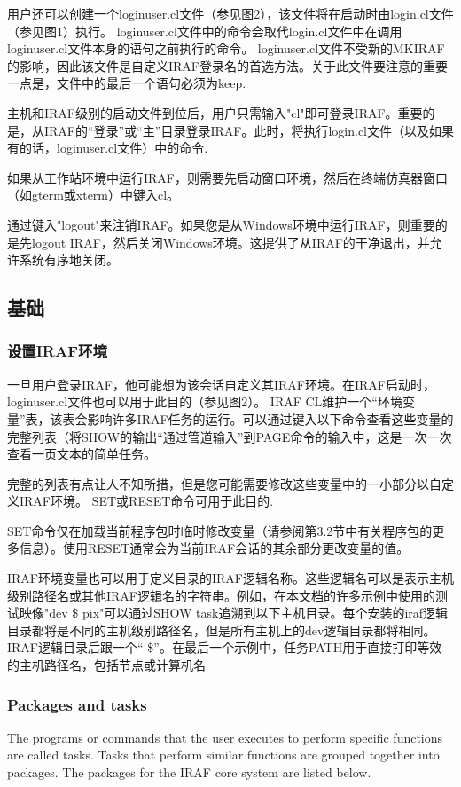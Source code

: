 \documentclass[CJK, utf8, GBK, oneside, a4paper, 12pt]{ctexart}
\begin{document}
用户还可以创建一个loginuser.cl文件（参见图2），该文件将在启动时由login.cl文件（参见图1）执行。 loginuser.cl文件中的命令会取代login.cl文件中在调用loginuser.cl文件本身的语句之前执行的命令。 loginuser.cl文件不受新的MKIRAF的影响，因此该文件是自定义IRAF登录名的首选方法。关于此文件要注意的重要一点是，文件中的最后一个语句必须为keep.

主机和IRAF级别的启动文件到位后，用户只需输入"cl"即可登录IRAF。重要的是，从IRAF的“登录”或“主”目录登录IRAF。此时，将执行login.cl文件（以及如果有的话，loginuser.cl文件）中的命令.

如果从工作站环境中运行IRAF，则需要先启动窗口环境，然后在终端仿真器窗口（如gterm或xterm）中键入cl。

通过键入"logout"来注销IRAF。如果您是从Windows环境中运行IRAF，则重要的是先logout IRAF，然后关闭Windows环境。这提供了从IRAF的干净退出，并允许系统有序地关闭。

\subsection{基础}
\subsubsection{设置IRAF环境}

一旦用户登录IRAF，他可能想为该会话自定义其IRAF环境。在IRAF启动时，loginuser.cl文件也可以用于此目的（参见图2）。 IRAF CL维护一个“环境变量”表，该表会影响许多IRAF任务的运行。可以通过键入以下命令查看这些变量的完整列表（将SHOW的输出“通过管道输入”到PAGE命令的输入中，这是一次一次查看一页文本的简单任务。

完整的列表有点让人不知所措，但是您可能需要修改这些变量中的一小部分以自定义IRAF环境。 SET或RESET命令可用于此目的.

SET命令仅在加载当前程序包时临时修改变量（请参阅第3.2节中有关程序包的更多信息）。使用RESET通常会为当前IRAF会话的其余部分更改变量的值。

IRAF环境变量也可以用于定义目录的IRAF逻辑名称。这些逻辑名可以是表示主机级别路径名或其他IRAF逻辑名的字符串。例如，在本文档的许多示例中使用的测试映像"dev \$ pix"可以通过SHOW task追溯到以下主机目录。每个安装的iraf逻辑目录都将是不同的主机级别路径名，但是所有主机上的dev逻辑目录都将相同。 IRAF逻辑目录后跟一个“ \$”。在最后一个示例中，任务PATH用于直接打印等效的主机路径名，包括节点或计算机名

\subsubsection{Packages and tasks}
The programs or commands that the user executes to perform specific functions are called
tasks. Tasks that perform similar functions are grouped together into packages. The packages
for the IRAF core system are listed below.
\end{document}
